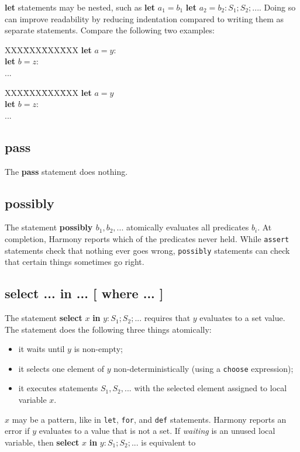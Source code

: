 \documentclass{report}
\newenvironment{code}{
\tcolorbox
}{
\endtcolorbox
}
\begin{document}
\textbf{let} statements may be nested, such as
\textbf{let} $a_1 = b_1$ \textbf{let} $a_2 = b_2: S_1; S_2; ...$.
Doing so can improve readability by reducing indentation
compared to writing them as separate statements.
Compare the following two examples:

\begin{code}
\begin{tabbing}
XXX\=XXX\=XXX\=XXX\kill
\>\textbf{let} $a = y$: \\
\>\>\textbf{let} $b = z$: \\
\>\>\>...
\end{tabbing}
\end{code}
\begin{code}
\begin{tabbing}
XXX\=XXX\=XXX\=XXX\kill
\>\textbf{let} $a = y$ \\
\>\textbf{let} $b = z$: \\
\>\>...
\end{tabbing}
\end{code}

\subsection*{\textbf{pass}}

The \textbf{pass} statement does nothing.

\subsection*{\textbf{possibly}}

The statement \textbf{possibly $b_1, b_2, ...$} atomically evaluates all
predicates $b_i$.
At completion, Harmony reports which of the predicates never held.
While \texttt{assert} statements check that nothing ever goes wrong,
\texttt{possibly} statements can check that certain things sometimes
go right.

\subsection*{\textbf{select ... in ... [ where ... ]}}

The statement \textbf{select} $x$ \textbf{in} $y: S_1; S_2; ...$
requires that $y$ evaluates to a set value.
The statement does the following three things atomically:
\begin{itemize}
\item it waits until $y$ is non-empty;
\item it selects one element of $y$ non-deterministically (using
a \texttt{choose} expression);
\item it executes statements $S_1, S_2, ...$ with the selected element
assigned to local variable $x$.
\end{itemize}
$x$ may be a pattern, like in \texttt{let}, \texttt{for}, and \texttt{def}
statements.
Harmony reports an error if $y$ evaluates to a value that is not a set.
If \textit{waiting} is an unused local variable,
then \textbf{select} $x$ \textbf{in} $y: S_1; S_2; ...$ is equivalent to
\end{document}
